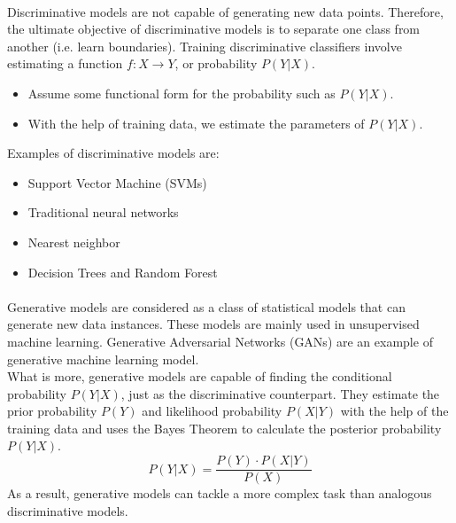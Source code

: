     \paragraph{}
    
    Discriminative models are not capable of generating new data points. Therefore, the ultimate objective of discriminative models is to separate one class from another (i.e. learn boundaries). Training discriminative classifiers involve estimating a function $f: X \rightarrow Y$, or probability $P(Y|X)$.
    \begin{itemize}
        \item Assume some functional form for the probability such as $P(Y|X)$.
        \item With the help of training data, we estimate the parameters of $P(Y|X)$.
    \end{itemize}
    
    Examples of discriminative models are:
    
    \begin{itemize}
        \item Support Vector Machine (SVMs)
        \item Traditional neural networks
        \item Nearest neighbor
        \item Decision Trees and Random Forest
    \end{itemize}
    
    \paragraph{}
    
    Generative models are considered as a class of statistical models that can generate new data instances. These models are mainly used in unsupervised machine learning.
    Generative Adversarial Networks (GANs) are an example of generative machine learning model.\\
    What is more, generative models are capable of finding the conditional probability $P(Y|X)$, just as the discriminative counterpart. They estimate the prior probability $P(Y)$ and likelihood probability $P(X|Y)$ with the help of the training data and uses the Bayes Theorem to calculate the posterior probability $P(Y|X)$.
    \begin{equation}
        P(Y|X) = \frac{P(Y) \cdot P(X|Y)}{P(X)}
    \end{equation}
    As a result, generative models can tackle a more complex task than analogous discriminative models.
    
